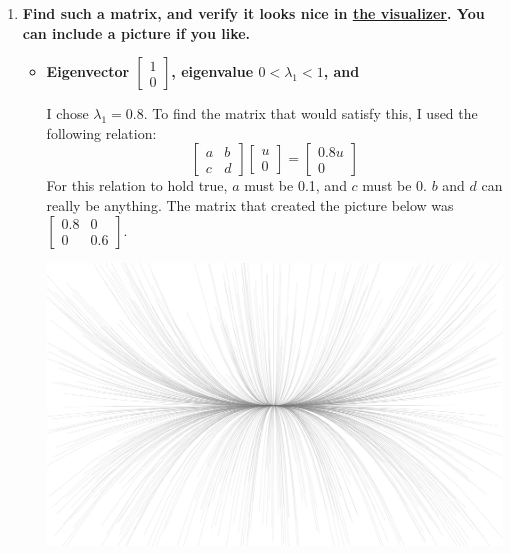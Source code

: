 \documentclass[11pt]{article}
\begin{document}
\begin{enumerate}[label=\textbf{\arabic*.}]
{\begin{enumerate}[label=\textbf{(\alph*)}]
{\begin{itemize}
{\begin{center}
                                \end{center}
                        }
                    \end{itemize}
                }
                \item{
                    \textbf{Find such a matrix, and verify it looks nice in \href{https://snap.berkeley.edu/snap/snap.html\#present:Username=cmorland&ProjectName=matrices}{\underline{the visualizer}}. You can include a picture if you like.}
                    \begin{itemize}
                        \item{
                            \textbf{\boldmath Eigenvector $\begin{bmatrix}1 \\ 0\end{bmatrix}$, eigenvalue $0<\lambda_1<1$, and}
                            \par
                            I chose $\lambda_1=0.8$. To find the matrix that would satisfy this, I used the following relation:
                            \begin{equation*}
                                \begin{bmatrix}
                                    a & b \\
                                    c & d
                                \end{bmatrix}
                                \begin{bmatrix}
                                    u \\ 0
                                \end{bmatrix}
                                =
                                \begin{bmatrix}
                                    0.8u \\ 0
                                \end{bmatrix}
                            \end{equation*}
                            For this relation to hold true, $a$ must be 0.1, and $c$ must be 0. $b$ and $d$ can really be anything. The matrix that created the picture below was $\begin{bmatrix}0.8 & 0 \\ 0 & 0.6\end{bmatrix}$.
                            \begin{center}
                                \includegraphics[width=0.7\linewidth]{1b1.PNG}

\end{center}}
\end{itemize}}
\end{enumerate}}
\end{enumerate}
\end{document}
